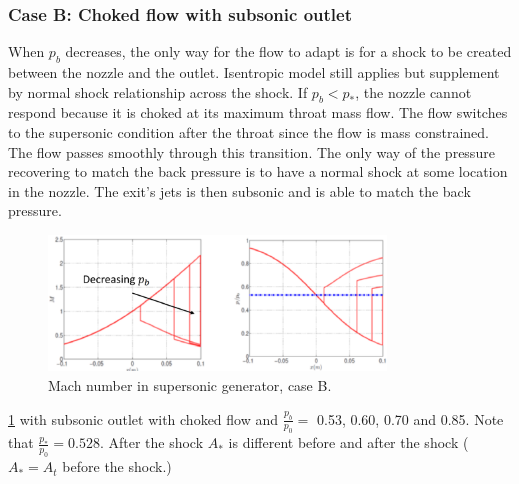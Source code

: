 \subsubsection{Case B: Choked flow with subsonic outlet}
When $p_b$ decreases, the only way for the flow to adapt is for a shock to be created between the nozzle and the outlet. Isentropic model still applies but supplement by normal shock relationship across the shock. If $p_b < p_*$, the nozzle cannot respond because it is choked at its maximum throat mass flow. The flow switches to the supersonic condition after the throat since the flow is mass constrained. The flow passes smoothly through this transition. The only way of the pressure recovering to match the back pressure is to have a normal shock at some location in the nozzle. The exit's jets is then subsonic and is able to match the back pressure.
\begin{figure}[H]
    \centering
    \includegraphics[width = 0.8\textwidth]{./img/diagram58.png}
    \caption{Mach number in supersonic generator, case B.}
    \label{casebmachnumber}
\end{figure}
\ref{casebmachnumber} with subsonic outlet with choked flow and $\frac{p_b}{p_0} =$ 0.53, 0.60, 0.70 and 0.85. Note that $\frac{p_*}{p_0} = 0.528$. After the shock $A_*$ is different before and after the shock ($A_* = A_t$ before the shock.)

